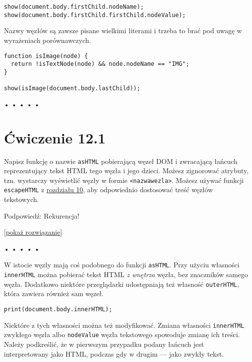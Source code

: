   
\begin{verbatim} 
show(document.body.firstChild.nodeName);
show(document.body.firstChild.firstChild.nodeValue);
 \end{verbatim}
  
Nazwy węzłów są zawsze pisane wielkimi literami i trzeba to brać pod uwagę w wyrażeniach porównawczych.

  
\begin{verbatim} 
function isImage(node) {
  return !isTextNode(node) && node.nodeName == "IMG";
}

show(isImage(document.body.lastChild));
 \end{verbatim}


\begin{center}
• • • • •
\end{center}

  
\section*{Ćwiczenie 12.1}
\label{sec:12.1}
  
    
Napisz funkcję o nazwie \texttt{asHTML} pobierającą węzeł DOM i zwracającą łańcuch reprezentujący tekst HTML tego węzła i jego dzieci. Możesz zignorować atrybuty, tzn. wystarczy wyświetlić węzły w formie \texttt{<nazwawezla>}. Możesz używać funkcji \texttt{escapeHTML} z \hyperref[chap:10]{rozdziału 10}, aby odpowiednio dostosować treść węzłów tekstowych.

    
Podpowiedź: Rekurencja!

  
[\hyperref[sol:12.1]{pokaż rozwiązanie}]


\begin{center}
• • • • •
\end{center}

  
W istocie węzły mają coś podobnego do funkcji \texttt{asHTML}. Przy użyciu własności \texttt{innerHTML} można pobierać tekst HTML \emph{z wnętrza} węzła, bez znaczników samego węzła. Dodatkowo niektóre przeglądarki udostępniają też własność \texttt{outerHTML}, która zawiera również sam węzeł.

  
\begin{verbatim} 
print(document.body.innerHTML);
\end{verbatim}
  
Niektóre z tych własności można też modyfikować. Zmiana własności \texttt{innerHTML} zwykłego węzła albo \texttt{nodeValue} węzła tekstowego spowoduje zmianę ich treści. Należy podkreślić, że w pierwszym przypadku podany łańcuch jest interpretowany jako HTML, podczas gdy w drugim — jako zwykły tekst.

